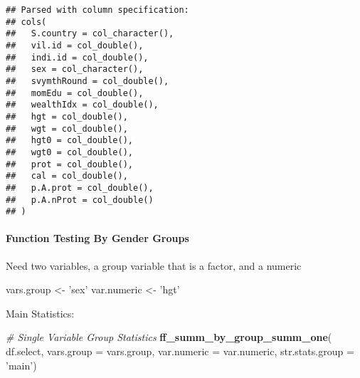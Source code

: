 \documentclass[
]{book}
\newenvironment{Shaded}{\begin{snugshade}}{\end{snugshade}}
\newcommand{\CommentTok}[1]{\textcolor[rgb]{0.56,0.35,0.01}{\textit{#1}}}
\newcommand{\DataTypeTok}[1]{\textcolor[rgb]{0.13,0.29,0.53}{#1}}
\newcommand{\KeywordTok}[1]{\textcolor[rgb]{0.13,0.29,0.53}{\textbf{#1}}}
\newcommand{\NormalTok}[1]{#1}
\newcommand{\OperatorTok}[1]{\textcolor[rgb]{0.81,0.36,0.00}{\textbf{#1}}}
\newcommand{\StringTok}[1]{\textcolor[rgb]{0.31,0.60,0.02}{#1}}
\begin{document}
\begin{verbatim}
## Parsed with column specification:
## cols(
##   S.country = col_character(),
##   vil.id = col_double(),
##   indi.id = col_double(),
##   sex = col_character(),
##   svymthRound = col_double(),
##   momEdu = col_double(),
##   wealthIdx = col_double(),
##   hgt = col_double(),
##   wgt = col_double(),
##   hgt0 = col_double(),
##   wgt0 = col_double(),
##   prot = col_double(),
##   cal = col_double(),
##   p.A.prot = col_double(),
##   p.A.nProt = col_double()
## )
\end{verbatim}

\hypertarget{function-testing-by-gender-groups}{%
\paragraph{Function Testing By Gender Groups}\label{function-testing-by-gender-groups}}

Need two variables, a group variable that is a factor, and a numeric

\begin{Shaded}
\begin{Highlighting}[]
\NormalTok{vars.group <-}\StringTok{ 'sex'}
\NormalTok{var.numeric <-}\StringTok{ 'hgt'}
\end{Highlighting}
\end{Shaded}

\begin{Shaded}
\end{Shaded}

Main Statistics:

\begin{Shaded}
\begin{Highlighting}[]
\CommentTok{# Single Variable Group Statistics}
\KeywordTok{ff_summ_by_group_summ_one}\NormalTok{(}
\NormalTok{  df.select, }\DataTypeTok{vars.group =}\NormalTok{ vars.group, }\DataTypeTok{var.numeric =}\NormalTok{ var.numeric, }
  \DataTypeTok{str.stats.group =} \StringTok{'main'}\NormalTok{)}
\end{Highlighting}
\end{Shaded}
\end{document}

